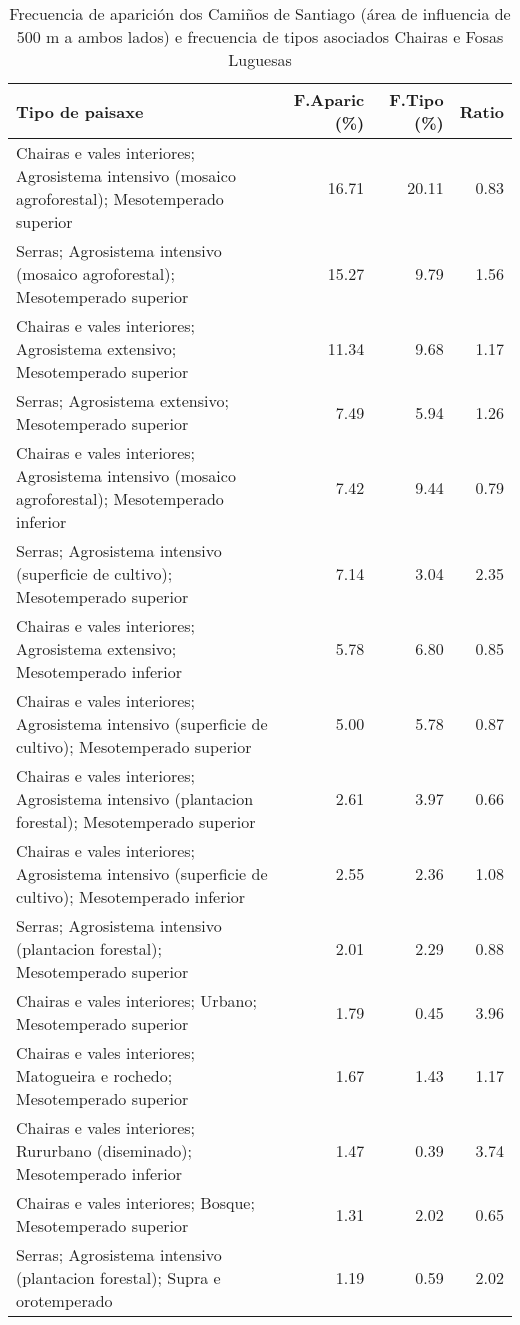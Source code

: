 \begin{table}[p]
\centering
\caption{Frecuencia de aparición dos Camiños de Santiago (área de influencia de 500 m a ambos lados) e frecuencia de tipos asociados Chairas e Fosas Luguesas} 
\label{vcamino6}
\begin{tabular}{lrrr}
  \hline
Tipo de paisaxe & F.Aparic (\%) & F.Tipo (\%) & Ratio \\ 
  \hline
Chairas e vales interiores; Agrosistema intensivo (mosaico agroforestal); Mesotemperado superior & 16.71 & 20.11 & 0.83 \\ 
  Serras; Agrosistema intensivo (mosaico agroforestal); Mesotemperado superior & 15.27 & 9.79 & 1.56 \\ 
  Chairas e vales interiores; Agrosistema extensivo; Mesotemperado superior & 11.34 & 9.68 & 1.17 \\ 
  Serras; Agrosistema extensivo; Mesotemperado superior & 7.49 & 5.94 & 1.26 \\ 
  Chairas e vales interiores; Agrosistema intensivo (mosaico agroforestal); Mesotemperado inferior & 7.42 & 9.44 & 0.79 \\ 
  Serras; Agrosistema intensivo (superficie de cultivo); Mesotemperado superior & 7.14 & 3.04 & 2.35 \\ 
  Chairas e vales interiores; Agrosistema extensivo; Mesotemperado inferior & 5.78 & 6.80 & 0.85 \\ 
  Chairas e vales interiores; Agrosistema intensivo (superficie de cultivo); Mesotemperado superior & 5.00 & 5.78 & 0.87 \\ 
  Chairas e vales interiores; Agrosistema intensivo (plantacion forestal); Mesotemperado superior & 2.61 & 3.97 & 0.66 \\ 
  Chairas e vales interiores; Agrosistema intensivo (superficie de cultivo); Mesotemperado inferior & 2.55 & 2.36 & 1.08 \\ 
  Serras; Agrosistema intensivo (plantacion forestal); Mesotemperado superior & 2.01 & 2.29 & 0.88 \\ 
  Chairas e vales interiores; Urbano; Mesotemperado superior & 1.79 & 0.45 & 3.96 \\ 
  Chairas e vales interiores; Matogueira e rochedo; Mesotemperado superior & 1.67 & 1.43 & 1.17 \\ 
  Chairas e vales interiores; Rururbano (diseminado); Mesotemperado inferior & 1.47 & 0.39 & 3.74 \\ 
  Chairas e vales interiores; Bosque; Mesotemperado superior & 1.31 & 2.02 & 0.65 \\ 
  Serras; Agrosistema intensivo (plantacion forestal); Supra e orotemperado & 1.19 & 0.59 & 2.02 \\ 
   \hline
\end{tabular}
\end{table}
